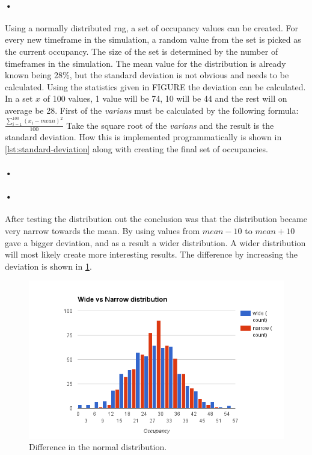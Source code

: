 \documentclass[a4paper, 12pt]{report}
\begin{document}
\paragraph{•}
Using a normally distributed \gls{rng}, a set of occupancy values can be created.
For every new timeframe in the simulation, a random value from the set is picked as the current occupancy.
The size of the set is determined by the number of timeframes in the simulation.
The mean value for the distribution is already known being 28\%, but the standard deviation is not obvious and needs to be calculated.
Using the statistics given in FIGURE the deviation can be calculated.
In a set $x$ of 100 values, 1 value will be 74, 10 will be 44 and the rest will on average be 28.
First of the \textit{varians} must be calculated by the following formula:
$ \frac{\sum_{i=1}^{100} (x_i - mean)^2}{100}$
Take the square root of the \textit{varians} and the result is the standard deviation.
How this is implemented programmatically is shown in \ref{lst:standard-deviation} along with creating the final set of occupancies.

\paragraph{•}
\begin{minipage}{\linewidth}

\end{minipage}

\paragraph{•}
After testing the distribution out the conclusion was that the distribution became very narrow towards the mean.
By using values from $mean-10$ to $mean+10$ gave a bigger deviation, and as a result a wider distribution.
A wider distribution will most likely create more interesting results.
The difference by increasing the deviation is shown in \ref{fig:distribution}.

\begin{figure}[h!]
	\centering
		\includegraphics[width=1.0\textwidth]{images/normal-dist-diff.png}
		\caption{Difference in the normal distribution.}
		\label{fig:distribution}
\end{figure}
\end{document}
